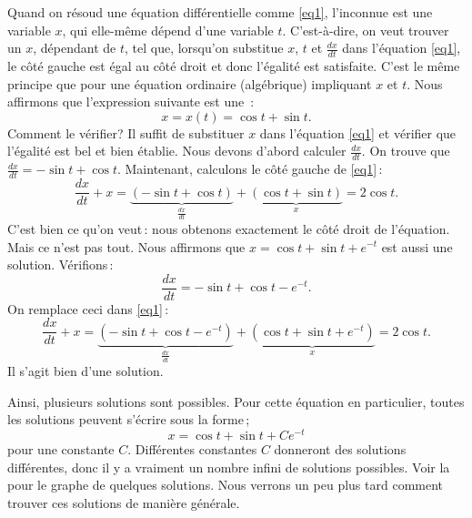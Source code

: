 Quand on résoud une \'equation diff\'erentielle comme \eqref{eq1}, l'inconnue est une variable $x$, qui elle-même d\'epend d'une variable $t$.  C'est-\`a-dire, on veut trouver un $x$, dépendant de $t$, tel que, lorsqu'on substitue $x$, $t$ et $\frac{dx}{dt}$ dans l'équation \eqref{eq1}, le c\^ot\'e gauche est \'egal au c\^ot\'e droit et donc l'\'egalit\'e est satisfaite.  C'est le m\^eme principe que pour une \'equation ordinaire (alg\'ebrique) impliquant $x$ et $t$.  Nous affirmons que l'expression suivante est une \emph{}\,: 
\begin{equation*}
x = x(t) = \cos t + \sin t .
\end{equation*}
%
Comment le v\'erifier?  Il suffit de substituer $x$ dans l'\'equation \eqref{eq1} et vérifier que l'égalité est bel et bien établie.    Nous devons d'abord calculer $\frac{dx}{dt}$.  On trouve que $\frac{dx}{dt} = 
-\sin t + \cos t$.  Maintenant, calculons le c\^ot\'e gauche de \eqref{eq1}\,: 
\begin{equation*}
\frac{dx}{dt} + x = 
\underbrace{(-\sin t + \cos t)}_{\frac{dx}{dt}}
+
\underbrace{(\cos t + \sin t)}_{x}
=
2\cos t .
\end{equation*}
C'est bien ce qu'on veut\,: nous obtenons exactement le c\^ot\'e droit de l'\'equation.
Mais ce n'est pas tout. 
Nous affirmons que 
$x = \cos t + \sin t + e^{-t}$ est aussi une solution.  Vérifions\,: 
\begin{equation*}
\frac{dx}{dt} = -\sin t + \cos t - e^{-t} .
\end{equation*}
On remplace ceci dans \eqref{eq1}\,: 
\begin{equation*}
\frac{dx}{dt} + x = 
\underbrace{(-\sin t + \cos t - e^{-t})}_{\frac{dx}{dt}} +
\underbrace{(\cos t + \sin t + e^{-t})}_{x}
= 2\cos t .
\end{equation*}
Il s'agit bien d'une solution.

Ainsi, plusieurs solutions sont possibles.  Pour cette \'equation en particulier, toutes les solutions peuvent s'\'ecrire sous la forme\,; 
\begin{equation*}
x = \cos t + \sin t + C e^{-t} 
\end{equation*}
pour une constante $C$.  Diff\'erentes constantes $C$ donneront des solutions diff\'erentes, donc il y a vraiment un nombre infini de solutions possibles.  Voir la~ pour le graphe de quelques solutions.  Nous verrons un peu plus tard comment trouver ces solutions de mani\`ere g\'en\'erale.

\medskip

